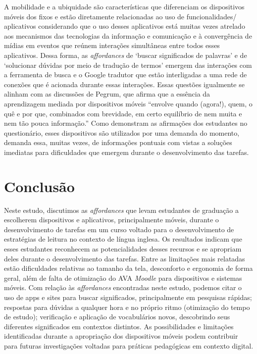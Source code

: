\documentclass[portuguese]{textolivre}
\begin{document}
A mobilidade e a ubiquidade são características que diferenciam os dispositivos móveis dos fixos e estão diretamente relacionadas ao uso de  funcionalidades/ aplicativos considerando que o uso desses aplicativos está muitas vezes atrelado aos mecanismos das tecnologias da informação e comunicação e à convergência de mídias em eventos que reúnem interações simultâneas entre todos esses aplicativos. Dessa forma, as \emph{affordances} de ‘buscar significados de palavras’ e de ‘solucionar dúvidas por meio de tradução de termos’ emergem das interações com a ferramenta de busca e o Google tradutor que estão interligadas a uma rede de conexões que é acionada durante essas interações. Essas questões igualmente se alinham com as discussões de \textcite[p. 20]{pegrum_mobile_2014}Pegrum, que afirma que a essência da aprendizagem mediada por dispositivos móveis “envolve quando (agora!), quem, o quê e por que, combinados com brevidade, em certo equilíbrio de nem muita e nem tão pouca informação.” Como demonstram as afirmações dos estudantes no questionário, esses dispositivos são utilizados por uma demanda do momento, demanda essa, muitas vezes, de informações pontuais com vistas a soluções imediatas para dificuldades que emergem durante o desenvolvimento das tarefas.

\section{Conclusão}

Neste estudo, discutimos as \emph{affordances} que levam estudantes de graduação a escolherem dispositivos e aplicativos, principalmente móveis, durante o desenvolvimento de tarefas em um curso voltado para o desenvolvimento de estratégias de leitura no contexto de língua inglesa. Os resultados indicam que esses estudantes reconhecem as potencialidades desses recursos e se apropriam deles durante o desenvolvimento das tarefas. Entre as limitações mais relatadas estão dificuldades relativas ao tamanho da tela, desconforto e ergonomia de forma geral, além de falta de otimização do AVA \emph{Moodle} para dispositivos e sistemas móveis. Com relação às \emph{affordances} encontradas neste estudo, podemos citar o uso de apps e sites para buscar significados, principalmente em pesquisas rápidas; respostas para dúvidas a qualquer hora e no próprio ritmo (otimização do tempo de estudo); verificação e aplicação de vocabulários novos, descobrindo seus diferentes significados em contextos distintos. As possibilidades e limitações identificadas durante a apropriação dos dispositivos móveis podem contribuir para futuras investigações voltadas para práticas pedagógicas em contexto digital.
\end{document}
